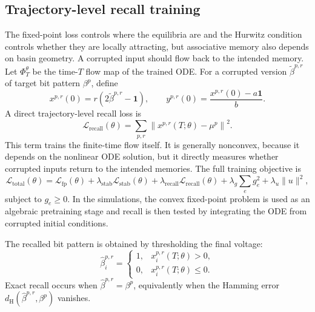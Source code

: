 \documentclass[11pt]{article}
\begin{document}
\subsection{Trajectory-level recall training}

The fixed-point loss controls where the equilibria are and the Hurwitz
condition controls whether they are locally attracting, but associative
memory also depends on basin geometry. A corrupted input should flow
back to the intended memory. Let $\Phi_T^\theta$ be the time-$T$ flow
map of the trained ODE. For a corrupted version $\tilde{\beta}^{p,r}$
of target bit pattern $\beta^p$, define
\begin{equation}
  x^{p,r}(0)
  =
  r(2\tilde{\beta}^{p,r}-\mathbf{1}),
  \qquad
  y^{p,r}(0)
  =
  \frac{x^{p,r}(0)-a\mathbf{1}}{b}.
  \label{eq:corrupted_initial_condition}
\end{equation}
A direct trajectory-level recall loss is
\begin{equation}
  \mathcal{L}_{\mathrm{recall}}(\theta)
  =
  \sum_{p,r}
  \left\|
    x^{p,r}(T;\theta)-\mu^p
  \right\|^2.
  \label{eq:recall_training_loss}
\end{equation}
This term trains the finite-time flow itself. It is generally
nonconvex, because it depends on the nonlinear ODE solution, but it
directly measures whether corrupted inputs return to the intended
memories. The full training objective is
\begin{equation}
  \mathcal{L}_{\mathrm{total}}(\theta)
  =
  \mathcal{L}_{\mathrm{fp}}(\theta)
  +
  \lambda_{\mathrm{stab}}\mathcal{L}_{\mathrm{stab}}(\theta)
  +
  \lambda_{\mathrm{recall}}\mathcal{L}_{\mathrm{recall}}(\theta)
  +
  \lambda_g\sum_e g_e^2
  +
  \lambda_u\|u\|^2,
  \label{eq:full_training_loss}
\end{equation}
subject to $g_e\geq 0$. In the simulations, the convex fixed-point
problem is used as an algebraic pretraining stage and recall is then
tested by integrating the ODE from corrupted initial conditions.

The recalled bit pattern is obtained by thresholding the final voltage:
\begin{equation}
  \widehat{\beta}^{p,r}_i
  =
  \begin{cases}
    1, & x_i^{p,r}(T;\theta)>0,\\
    0, & x_i^{p,r}(T;\theta)\leq 0.
  \end{cases}
  \label{eq:final_bit_classification}
\end{equation}
Exact recall occurs when $\widehat{\beta}^{p,r}=\beta^p$, equivalently
when the Hamming error $d_{\mathrm{H}}(\widehat{\beta}^{p,r},\beta^p)$
vanishes.
\end{document}

